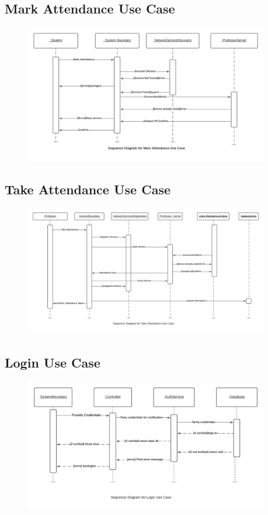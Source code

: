 \documentclass{article}
\begin{document}
\subsection{Mark Attendance Use Case}
\begin{figure}[H]
    \centering
    \includegraphics[width=0.95\textwidth]{MarkAttendance.jpeg}
    \caption{}
    \label{fig:MarkAttendace}
\end{figure}
\subsection{Take Attendance Use Case}
\begin{figure}[H]
    \centering
    \includegraphics[width=0.95\textwidth]{TakeAttendace.jpeg}
    \caption{}
    \label{fig:TakeAttendace}
\end{figure}
\subsection{Login Use Case}
\begin{figure}[H]
    \centering
    \includegraphics[width=0.95\textwidth]{login sequence diagram.jpeg}
    \caption{}
    \label{fig:Login}
\end{figure}
\end{document}
